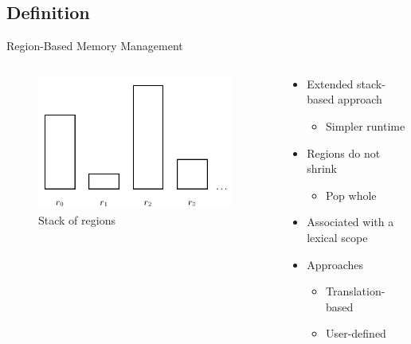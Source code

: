 \documentclass[xcolor=x11names,compress]{beamer}
\renewcommand{\(}{\begin{columns}}
\renewcommand{\)}{\end{columns}}
\newcommand{\<}[1]{\begin{column}{#1}}
\renewcommand{\>}{\end{column}}
\begin{document}
\subsection{Definition}
\begin{frame}{Region-Based Memory Management}
    \begin{columns}[T]
        \begin{column}{.40\textwidth}
            \begin{figure}[h]
                \centering
                \includegraphics[width=0.96\textwidth]{regions-blocks.png}
                \caption{Stack of regions}
            \end{figure}
        \end{column}
        \hfill
        \begin{column}{.56\textwidth}
            \begin{itemize}
                \item Extended stack-based approach
                \begin{itemize}
                    \item Simpler runtime
                \end{itemize}
                \item Regions do not shrink
                \begin{itemize}
                    \item Pop whole
                \end{itemize}
                \item Associated with a lexical scope
                \pause
                \item Approaches
                \begin{itemize}
                    \item Translation-based
                    \item User-defined
                \end{itemize}
            \end{itemize}
        \end{column}
    \end{columns}
\end{frame}
\end{document}
